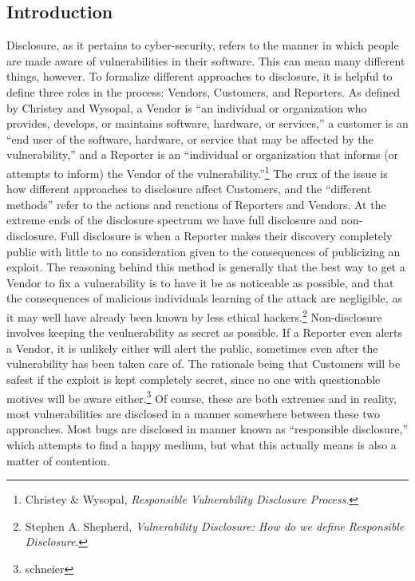 \documentclass[12pt]{article}
\begin{document}
\begin{doublespace}
\section*{Introduction}
Disclosure, as it pertains to cyber-security, refers to the manner in which
people are made aware of vulnerabilities in their software. This can mean many
different things, however. To formalize different approaches to disclosure, it
is helpful to define three roles in the process: Vendors, Customers, and
Reporters. As defined by Christey and Wysopal,
a Vendor is ``an individual or organization who provides, develops, or
maintains software, hardware, or services,'' a customer is 
an ``end user of the software, hardware, or service that may be affected by the
vulnerability,'' and a Reporter is an ``individual or organization that informs
(or attempts to inform) the Vendor of the vulnerability.''\footnote{Christey \& Wysopal, \textit{Responsible Vulnerability Disclosure Process}.}
The crux of the
issue is how different approaches to disclosure affect Customers, and the
``different methods'' refer to the actions and reactions of Reporters and
Vendors. At the extreme ends of the disclosure spectrum we have full disclosure
and non-disclosure. Full disclosure is when a Reporter makes their discovery
completely public with little to no consideration given to the consequences of
publicizing an exploit. The reasoning behind this method is generally that the
best way to get a Vendor to fix a vulnerability is to have it be as noticeable
as possible, and
that the consequences of malicious individuals learning of the attack are
negligible, as it may well have already been known by less ethical hackers.\footnote{Stephen A. Shepherd, \textit{ Vulnerability Disclosure: How do we define Responsible Disclosure}.}
Non-disclosure involves keeping the veulnerability as secret as possible. If a
Reporter even alerts a Vendor, it is unlikely either will
alert the public, sometimes even after the vulnerability has been taken
care of. The rationale being that Customers will be safest if the exploit is
kept completely secret, since no one with questionable motives will be aware
either.\footnote{schneier}
Of course, these are both extremes and in reality, most
vulnerabilities are disclosed in a manner somewhere between these two
approaches. Most bugs are disclosed in manner known as
``responsible disclosure,'' which attempts to find a happy medium, but what
this actually means is also a matter of contention.


\end{doublespace}
\end{document}
